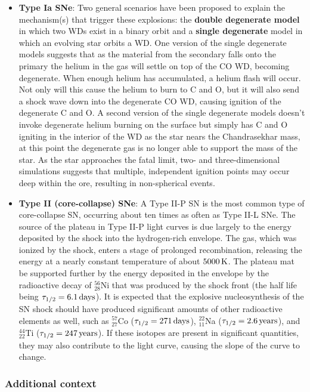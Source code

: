 \documentclass[a4paper,10pt]{article}
\begin{document}
\begin{itemize}
    \item \textbf{Type Ia SNe}: Two general scenarios have been proposed to explain the mechanism(s) that trigger these explosions: the \textbf{double degenerate model} in which two WDs exist in a binary orbit and a \textbf{single degenerate} model in which an evolving star orbits a WD. One version of the single degenerate models suggests that as the material from the secondary falls onto the primary the helium in the gas will settle on top of the CO WD, becoming degenerate. When enough helium has accumulated, a helium flash will occur. Not only will this cause the helium to burn to C and O, but it will also send a shock wave down into the degenerate CO WD, causing ignition of the degenerate C and O. A second version of the single degenerate models doesn't invoke degenerate helium burning on the surface but simply has C and O igniting in the interior of the WD as the star nears the Chandrasekhar mass, at this point the degenerate gas is no longer able to support the mass of the star. As the star approaches the fatal limit, two- and three-dimensional simulations suggests that multiple, independent ignition points may occur deep within the ore, resulting in non-spherical events.
    \item \textbf{Type II (core-collapse) SNe}: A Type II-P SN is the most common type of core-collapse SN, occurring about ten times as often as Type II-L SNe. The source of the plateau in Type II-P light curves is due largely to the energy deposited by the shock into the hydrogen-rich envelope. The gas, which was ionized by the shock, enters a stage of prolonged recombination, releasing the energy at a nearly constant temperature of about $5000\,{\rm K}$. The plateau mat be supported further by the energy deposited in the envelope by the radioactive decay of $^{56}_{28}$Ni that was produced by the shock front (the half life being $\tau_{1/2}=6.1\,{\rm days}$). It is expected that the explosive nucleosynthesis of the SN shock should have produced significant amounts of other radioactive elements as well, such as $^{57}_{27}$Co ($\tau_{1/2}=271\,{\rm days}$), $^{22}_{11}$Na ($\tau_{1/2}=2.6\,{\rm years}$), and $^{44}_{22}$Ti ($\tau_{1/2}=247\,{\rm years}$). If these isotopes are present in significant quantities, they may also contribute to the light curve, causing the slope of the curve to change.
\end{itemize}

\subsubsection{Additional context}
\end{document}
